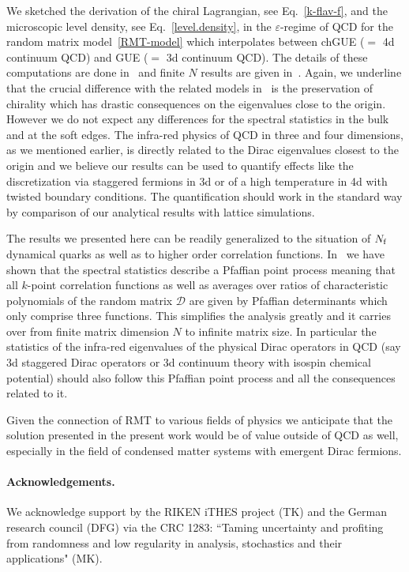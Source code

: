 \documentclass[aps,prl,reprint,graphicx,showpacs]{revtex4-1}
\renewcommand{\epsilon}{\varepsilon}
\begin{document}
We sketched the derivation of the chiral Lagrangian, see Eq.~\eqref{k-flav-f}, and the microscopic level density, see Eq.~\eqref{level.density}, in the $\epsilon$-regime of QCD for the random matrix model~\eqref{RMT-model} which interpolates between chGUE ($=$ 4d continuum QCD) and GUE ($=$ 3d continuum QCD). The details of these computations are done in~\cite{Kanazawa:2018b} and finite $N$ results are given in~\cite{Kanazawa:2018a}. Again, we underline that the crucial difference with the related models in~\cite{Damgaard:2010cz,Akemann:2011} is the preservation of chirality which has drastic consequences on the eigenvalues close to the origin. However we do not expect any differences for the spectral statistics in the bulk and at the soft edges. The infra-red physics of QCD in three and four dimensions, as we mentioned earlier, is directly related to the Dirac eigenvalues closest to the origin and we believe our results can be used to quantify effects like the discretization via staggered fermions in 3d or of a high temperature in 4d {  with twisted boundary conditions. The quantification should work in the standard way by comparison of our analytical results with lattice simulations.}

The results we presented here can be readily generalized to the situation of $N_{\rm f}$ dynamical quarks as well as to higher order correlation functions. In~\cite{Kanazawa:2018a} we have shown that the spectral statistics describe a Pfaffian point process meaning that all $k$-point correlation functions as well as averages over ratios of characteristic polynomials of the random matrix $\mathcal{D}$ are given by Pfaffian determinants which only comprise three functions. This simplifies the analysis greatly and it carries over from finite matrix dimension $N$ to infinite matrix size. In particular the statistics of the infra-red eigenvalues of the physical Dirac operators in QCD (say 3d staggered Dirac operators or 3d continuum theory with isospin chemical potential) should also follow this Pfaffian point process and all the consequences related to it.

{  Given the connection of RMT to various fields of physics we anticipate that
   the solution presented in the present work would be of value outside of QCD as well,
   especially in the field of condensed matter systems with emergent Dirac
   fermions.}

\paragraph{Acknowledgements.}
We acknowledge support by the RIKEN iTHES project (TK) and  the German research council (DFG) via the CRC 1283: ``Taming uncertainty and profiting from randomness and low regularity in analysis, stochastics and their applications" (MK). 
\end{document}
